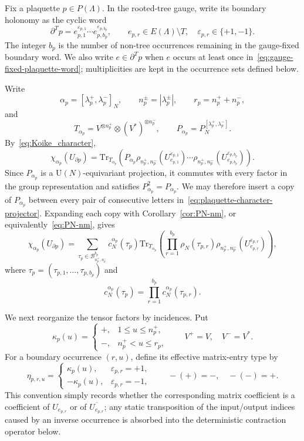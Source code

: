 \documentclass[11pt,a4paper,reqno]{article}
\theoremstyle{definition}
\theoremstyle{remark}
\newcommand\U{{\mathrm U}}
\newcommand\Tr{\mathrm{Tr}}
\begin{document}
Fix a plaquette $p\in P(\Lambda)$. In the rooted-tree gauge, write its boundary holonomy as the cyclic word
\begin{equation}\label{eq:gauge-fixed-plaquette-word}
\partial^Tp=e_{p,1}^{\varepsilon_{p,1}}\cdots e_{p,b_p}^{\varepsilon_{p,b_p}},
\qquad e_{p,r}\in E(\Lambda)\setminus T,
\quad \varepsilon_{p,r}\in\{+1,-1\}.
\end{equation}
The integer $b_p$ is the number of non-tree occurrences remaining in the gauge-fixed boundary word. We also write $e\in\partial^Tp$ when $e$ occurs at least once in~\eqref{eq:gauge-fixed-plaquette-word}; multiplicities are kept in the occurrence sets defined below.

Write
\[
\alpha_p=[\lambda_p^+,\lambda_p^-]_N,
\qquad n_p^\pm=|\lambda_p^\pm|,
\qquad r_p=n_p^++n_p^-,
\]
and
\[
T_{\alpha_p}=V^{\otimes n_p^+}\otimes(V^*)^{\otimes n_p^-},
\qquad P_{\alpha_p}=P_N^{[\lambda_p^+,\lambda_p^-]}.
\]
By~\eqref{eq:Koike_character},
\begin{equation}\label{eq:plaquette-character-projector}
\chi_{\alpha_p}(U_{\partial p})
=\Tr_{T_{\alpha_p}}\!\left(
P_{\alpha_p}\rho_{n_p^+,n_p^-}(U_{e_{p,1}}^{\varepsilon_{p,1}})\cdots
\rho_{n_p^+,n_p^-}(U_{e_{p,b_p}}^{\varepsilon_{p,b_p}})
\right).
\end{equation}
Since $P_{\alpha_p}$ is a $\U(N)$-equivariant projection, it commutes with every factor in the group representation and satisfies $P_{\alpha_p}^2=P_{\alpha_p}$. We may therefore insert a copy of $P_{\alpha_p}$ between every pair of consecutive letters in~\eqref{eq:plaquette-character-projector}. Expanding each copy with Corollary~\ref{cor:PN-nm}, or equivalently~\eqref{eq:PN-nm}, gives
\begin{equation}\label{eq:local-brauer-expansion-sec3}
\chi_{\alpha_p}(U_{\partial p})
=\sum_{\tau_p\in\mathcal B_{n_p^+,n_p^-}^{b_p}}
 c_N^{\alpha_p}(\tau_p)
\Tr_{T_{\alpha_p}}\!\left(
\prod_{r=1}^{b_p}
\rho_N(\tau_{p,r})\rho_{n_p^+,n_p^-}(U_{e_{p,r}}^{\varepsilon_{p,r}})
\right),
\end{equation}
where $\tau_p=(\tau_{p,1},\ldots,\tau_{p,b_p})$ and
\[
c_N^{\alpha_p}(\tau_p)=\prod_{r=1}^{b_p}c_N^{\alpha_p}(\tau_{p,r}).
\]

We next reorganize the tensor factors by incidences. Put
\[
\kappa_p(u)=
\begin{cases}
+,&1\le u\le n_p^+,\\
-,&n_p^+<u\le r_p,
\end{cases}
\qquad V^+=V,\quad V^-=V^*.
\]
For a boundary occurrence $(r,u)$, define its effective matrix-entry type by
\[
\eta_{p,r,u}=
\begin{cases}
\kappa_p(u),&\varepsilon_{p,r}=+1,\\
-\kappa_p(u),&\varepsilon_{p,r}=-1,
\end{cases}
\qquad -(+)=-,\quad -(-)=+.
\]
This convention simply records whether the corresponding matrix coefficient is a coefficient of $U_{e_{p,r}}$ or of $\overline{U_{e_{p,r}}}$; any static transposition of the input/output indices caused by an inverse occurrence is absorbed into the deterministic contraction operator below.
\end{document}

